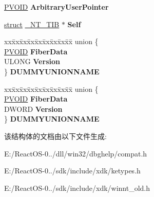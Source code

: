 \begin{DoxyCompactItemize}
\begin{tabbing}
\end{tabbing}\item 
\mbox{\label{struct___n_t___t_i_b_a1c7317b54558cc649c0ac0b27659269e}} 
\hyperlink{interfacevoid}{P\+V\+O\+ID} {\bfseries Arbitrary\+User\+Pointer}
\item 
\mbox{\label{struct___n_t___t_i_b_a29fcf5d5a076612b2acc98ca93eee9b4}} 
\hyperlink{interfacestruct}{struct} \hyperlink{struct___n_t___t_i_b}{\+\_\+\+N\+T\+\_\+\+T\+IB} $\ast$ {\bfseries Self}
\item 
\mbox{\label{struct___n_t___t_i_b_ad05cde1cfa758778a55ac2202b442e22}} 
\begin{tabbing}
xx\=xx\=xx\=xx\=xx\=xx\=xx\=xx\=xx\=\kill
union \{\\
\>\hyperlink{interfacevoid}{PVOID} {\bfseries FiberData}\\
\>ULONG {\bfseries Version}\\
\} {\bfseries DUMMYUNIONNAME}\\

\end{tabbing}\item 
\mbox{\label{struct___n_t___t_i_b_aae7e42d015c83815eae3b17317f7e6c4}} 
\begin{tabbing}
xx\=xx\=xx\=xx\=xx\=xx\=xx\=xx\=xx\=\kill
union \{\\
\>\hyperlink{interfacevoid}{PVOID} {\bfseries FiberData}\\
\>DWORD {\bfseries Version}\\
\} {\bfseries DUMMYUNIONNAME}\\

\end{tabbing}\end{DoxyCompactItemize}


该结构体的文档由以下文件生成\+:\begin{DoxyCompactItemize}
\item 
E\+:/\+React\+O\+S-\/0../dll/win32/dbghelp/compat.\+h\item 
E\+:/\+React\+O\+S-\/0../sdk/include/xdk/ketypes.\+h\item 
E\+:/\+React\+O\+S-\/0../sdk/include/xdk/winnt\+\_\+old.\+h\end{DoxyCompactItemize}
